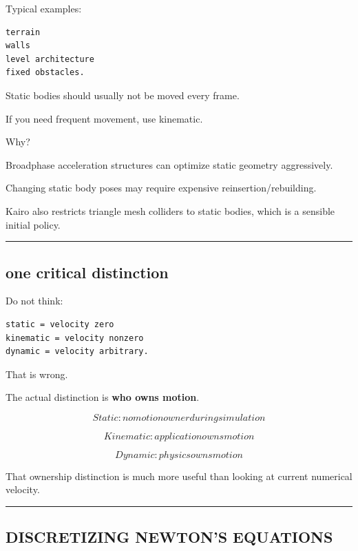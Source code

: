 Typical examples:

\begin{verbatim}
terrain
walls
level architecture
fixed obstacles.
\end{verbatim}

Static bodies should usually not be moved every frame.

If you need frequent movement, use kinematic.

Why?

Broadphase acceleration structures can optimize static geometry aggressively.

Changing static body poses may require expensive reinsertion/rebuilding.

Kairo also restricts triangle mesh colliders to static bodies, which is a sensible initial policy.

\begin{center}\rule{0.5\linewidth}{0.5pt}\end{center}

\subsection{one critical distinction}\label{06-engine-ii-ch037-one-critical-distinction}

\hypertarget{06-engine-ii-ch037-one-critical-distinction}{}

Do not think:

\begin{verbatim}
static = velocity zero
kinematic = velocity nonzero
dynamic = velocity arbitrary.
\end{verbatim}

That is wrong.

The actual distinction is \textbf{who owns motion}.

\[
\boxed{
Static:
no motion owner during simulation
}
\]

\[
\boxed{
Kinematic:
application owns motion
}
\]

\[
\boxed{
Dynamic:
physics owns motion
}
\]

That ownership distinction is much more useful than looking at current numerical velocity.

\begin{center}\rule{0.5\linewidth}{0.5pt}\end{center}

\subsection{DISCRETIZING NEWTON'S EQUATIONS}\label{06-engine-ii-ch037-discretizing-newtons-equations}

